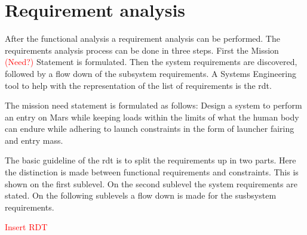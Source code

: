 \section{Requirement analysis}\label{ch:req}
After the functional analysis a requirement analysis can be performed. The requirements analysis process can be done in three steps. First the Mission \textcolor{red}{(Need?)} Statement is formulated. Then the system requirements are discovered, followed by a flow down of the subsystem requirements. A Systems Engineering tool to help with the representation of the list of requirements is the \gls{rdt}.

The mission need statement is formulated as follows:  Design a system to perform an entry on Mars while keeping loads within the limits of what the human body can endure while adhering to launch constraints in the form of launcher fairing and entry mass. \cite{Balasooriyan2015}

The basic guideline of the \gls{rdt} is to split the requirements up in two parts. Here the distinction is made between functional requirements and constraints. This is shown on the first sublevel. On the second sublevel the system requirements are stated. On the following sublevels a flow down is made for the susbsystem requirements.

\textcolor{red}{Insert RDT}